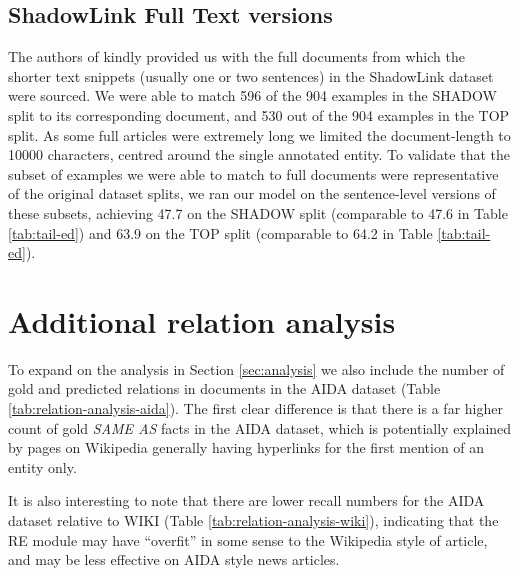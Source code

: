 \documentclass[11pt]{article}
\begin{document}
\subsection{ShadowLink Full Text versions}

The authors of \citet{provatorova-etal-2021-robustness} kindly provided us with the full documents from which the shorter text snippets (usually one or two sentences) in the ShadowLink dataset were sourced. We were able to match 596 of the 904 examples in the SHADOW split to its corresponding document, and 530 out of the 904 examples in the TOP split. As some full articles were extremely long we limited the document-length to 10000 characters, centred around the single annotated entity. To validate that the subset of examples we were able to match to full documents were representative of the original dataset splits, we ran our model on the sentence-level versions of these subsets, achieving 47.7 on the SHADOW split (comparable to 47.6 in Table \ref{tab:tail-ed}) and 63.9 on the TOP split (comparable to 64.2 in Table \ref{tab:tail-ed}). 


\section{Additional relation analysis}
\label{sec:additional-relation-analysis}

To expand on the analysis in Section \ref{sec:analysis} we also include the number of gold and predicted relations in documents in the AIDA dataset (Table \ref{tab:relation-analysis-aida}). The first clear difference is that there is a far higher count of gold \emph{SAME AS} facts in the AIDA dataset, which is potentially explained by pages on Wikipedia generally having hyperlinks for the first mention of an entity only.

It is also interesting to note that there are lower recall numbers for the AIDA dataset relative to WIKI (Table \ref{tab:relation-analysis-wiki}), indicating that the RE module may have ``overfit'' in some sense to the Wikipedia style of article, and may be less effective on AIDA style news articles. 
\end{document}
